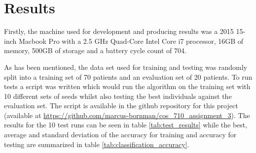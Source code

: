 \section{Results}
Firstly, the machine used for development and producing results was a 2015 15-inch Macbook Pro with a 2.5 GHz Quad-Core Intel Core i7 processor, 16GB of memory, 500GB of storage and a battery cycle count of 704.

As has been mentioned, the data set used for training and testing was randomly split into a training set of 70 patients and an evaluation set of 20 patients. To run tests a script was written which would run the algorithm on the training set with 10 different sets of seeds whilst also testing the best individuals against the evaluation set. The script is available in the github repository for this project (available at \url{https://github.com/marcus-bornman/cos_710_assignment_3}). The results for the 10 test runs can be seen in table \ref{tab:test_results} while the best, average and standard deviation of the accuracy for training and accuracy for testing are summarized in table \ref{tab:classification_accuracy}.

